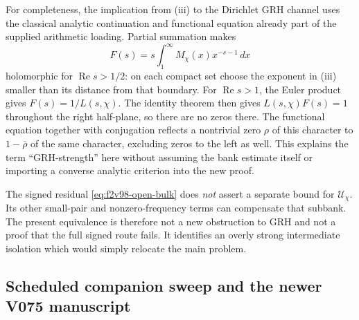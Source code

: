 \documentclass[11pt]{article}
\theoremstyle{definition}
\theoremstyle{remark}
\begin{document}
For completeness, the implication from (iii) to the Dirichlet GRH
channel uses the classical analytic continuation and functional equation
already part of the supplied arithmetic loading.  Partial summation
makes
\[
 F(s)=s\int_1^\infty M_\chi(x)x^{-s-1}\,dx
\]
holomorphic for \(\operatorname{Re}s>1/2\): on each compact set choose
the exponent in (iii) smaller than its distance from that boundary.
For \(\operatorname{Re}s>1\), the Euler product gives
\(F(s)=1/L(s,\chi)\).  The identity theorem then gives
\(L(s,\chi)F(s)=1\) throughout the right half-plane, so there are
no zeros there.  The functional equation together with conjugation
reflects a nontrivial zero \(\rho\) of this character to
\(1-\overline\rho\) of the same character, excluding zeros to the
left as well.  This explains the term ``GRH-strength'' here without
assuming the bank estimate itself or importing a converse analytic
criterion into the new proof.

The signed residual \eqref{eq:f2v98-open-bulk} does \emph{not} assert
a separate bound for \(\mathcal U_\chi\).  Its other small-pair and
nonzero-frequency terms can compensate that subbank.  The present
equivalence is therefore not a new obstruction to GRH and not a proof
that the full signed route fails.  It identifies an overly strong
intermediate isolation which would simply relocate the main problem.

\subsection{Scheduled companion sweep and the newer V075 manuscript}
\end{document}
